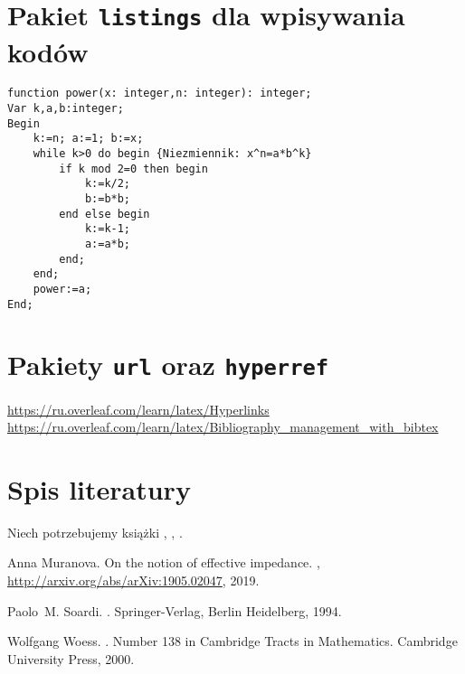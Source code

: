 \documentclass[a4paper, 12pt]{amsart}
\theoremstyle{definition}
\begin{document}
\section{Pakiet \texttt{listings} dla wpisywania kodów}
\lstset{language=Pascal}
\begin{lstlisting}
function power(x: integer,n: integer): integer;
Var k,a,b:integer;
Begin
	k:=n; a:=1; b:=x;
	while k>0 do begin {Niezmiennik: x^n=a*b^k}
		if k mod 2=0 then begin
			k:=k/2;
			b:=b*b;
		end else begin
			k:=k-1;
			a:=a*b;
		end;
	end;
	power:=a;
End;
\end{lstlisting}

\section{Pakiety \texttt{url} oraz \texttt{hyperref}}
\url{https://ru.overleaf.com/learn/latex/Hyperlinks}\\
\url{https://ru.overleaf.com/learn/latex/Bibliography_management_with_bibtex}\\

\section{Spis literatury}
Niech potrzebujemy książki  \cite{Muranova1}, \cite{Woess}, \cite{Soardi}.


%

\begin{thebibliography}{10}
Anna Muranova.
\newblock On the notion of effective impedance.
, \url{http://arxiv.org/abs/arXiv:1905.02047},
  2019.

Paolo~M. Soardi.
.
\newblock Springer-Verlag, Berlin Heidelberg, 1994.

Wolfgang Woess.
.
\newblock Number 138 in Cambridge Tracts in Mathematics. Cambridge University
  Press, 2000.


\end{thebibliography}
\end{document}
